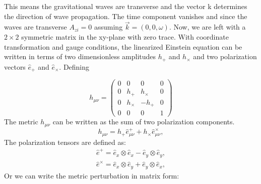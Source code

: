 \documentclass{ttuthes2007}
\begin{document}
This means the gravitational waves are transverse and the vector k
determines the direction of wave propagation. The time component vanishes and
since the waves are transverse $A_{zi}=0$ assuming $\vec{k}=(0,0,\omega)$. Now,
we are left with a $2 \times 2$ symmetric matrix in the xy-plane with zero trace. With coordinate transformation and gauge conditions, the linearized
Einstein equation can be written in terms of two dimensionless amplitudes
$h_+$ and $h_\times$ and two polarization vectors $\hat e_+$ and $\hat
e_\times$. Defining

\begin{equation*}                                                               
h_{\mu\nu}=                                                                  
 \begin{pmatrix}                                                                
    0 & 0 & 0 & 0 \\                                                           
    0 & h_+ & h_\times & 0 \\                                                            
    0 & h_\times & -h_+ & 0 \\                                                            
    0 & 0 & 0 & 1                                                               
 \end{pmatrix}                                                                  
\end{equation*} 
The metric $h_{\mu\nu}$ can be written as the sum of two polarization components.   
\begin{equation}
h_{\mu\nu}=h_+\hat e_{\mu\nu}^+ +h_\times \hat e_{\mu\nu}^\times,
\end{equation}
The polarization tensors are defined as:
\begin{equation}
\begin{aligned}
\hat e^+ = \hat e_x \otimes \hat e_x - \hat e_y \otimes \hat e_y, \\
\hat e^\times = \hat e_x \otimes \hat e_y + \hat e_y \otimes \hat e_x,
\end{aligned}
\end{equation}
Or we can write the metric perturbation in matrix form:
\end{document}
